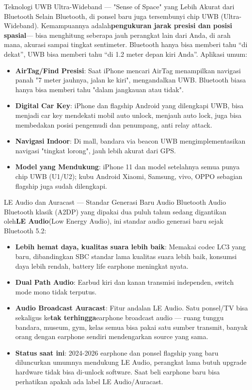 \begin{tcbinfo}{Teknologi UWB Ultra-Wideband — "Sense of Space" yang Lebih Akurat dari Bluetooth}
Selain Bluetooth, di ponsel baru juga tersembunyi chip UWB (Ultra-Wideband). Kemampuannya adalah\textbf{pengukuran jarak presisi dan posisi spasial}— bisa menghitung seberapa jauh perangkat lain dari Anda, di arah mana, akurasi sampai tingkat sentimeter. Bluetooth hanya bisa memberi tahu “di dekat”, UWB bisa memberi tahu “di 1.2 meter depan kiri Anda”. Aplikasi umum:

\begin{itemize}
  \item \textbf{AirTag/Find Presisi}: Saat iPhone mencari AirTag menampilkan navigasi panah "7 meter jauhnya, jalan ke kiri", mengandalkan UWB. Bluetooth biasa hanya bisa memberi tahu "dalam jangkauan atau tidak".
  \item \textbf{Digital Car Key}: iPhone dan flagship Android yang dilengkapi UWB, bisa menjadi car key mendekati mobil auto unlock, menjauh auto lock, juga bisa membedakan posisi pengemudi dan penumpang, anti relay attack.
  \item \textbf{Navigasi Indoor}: Di mall, bandara via beacon UWB mengimplementasikan navigasi "tingkat lorong", jauh lebih akurat dari GPS.
  \item \textbf{Model yang Mendukung}: iPhone 11 dan model setelahnya semua punya chip UWB (U1/U2); kubu Android Xiaomi, Samsung, vivo, OPPO sebagian flagship juga sudah dilengkapi.
\end{itemize}

\end{tcbinfo}

\begin{tcbinfo}{LE Audio dan Auracast — Standar Generasi Baru Audio Bluetooth}
Audio Bluetooth klasik (A2DP) yang dipakai dua puluh tahun sedang digantikan oleh\textbf{LE Audio}(Low Energy Audio), ini standar audio generasi baru sejak Bluetooth 5.2:

\begin{itemize}
  \item \textbf{Lebih hemat daya, kualitas suara lebih baik}: Memakai codec LC3 yang baru, dibandingkan SBC standar lama kualitas suara lebih baik, konsumsi daya lebih rendah, battery life earphone meningkat nyata.
  \item \textbf{Dual Path Audio}: Earbud kiri dan kanan transmisi independen, switch mode mono tidak terputus.
  \item \textbf{Audio Broadcast Auracast}: Fitur andalan LE Audio. Satu ponsel/TV bisa sekaligus ke\textbf{tak terhingga}earphone broadcast audio — ruang tunggu bandara, museum, gym, kelas semua bisa pakai satu sumber transmit, banyak orang dengan earphone sendiri mendengarkan source yang sama.
  \item \textbf{Status saat ini}: 2024-2026 earphone dan ponsel flagship yang baru diluncurkan umumnya mendukung LE Audio, perangkat lama butuh upgrade hardware tidak bisa di-unlock software. Saat beli earphone baru bisa perhatikan apakah ada label LE Audio/Auracast.
\end{itemize}

\end{tcbinfo}

